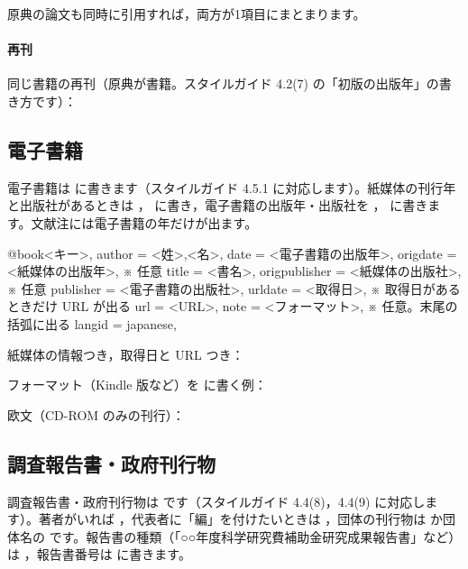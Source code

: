 
原典の論文も同時に引用すれば，両方が1項目にまとまります。


\paragraph{再刊}
同じ書籍の再刊（原典が書籍。スタイルガイド 4.2(7) の「初版の出版年」の書き方です）：


\subsection{電子書籍}\label{sec:ebook}
電子書籍は  に書きます（スタイルガイド 4.5.1 に対応します）。紙媒体の刊行年と出版社があるときは ， に書き，電子書籍の出版年・出版社を ， に書きます。文献注には電子書籍の年だけが出ます。

\begin{bibtemplate}
@book{<キー>,
  author        = {<姓>,<名>},
  date          = {<電子書籍の出版年>},
  origdate      = {<紙媒体の出版年>},    ※ 任意
  title         = {<書名>},
  origpublisher = {<紙媒体の出版社>},    ※ 任意
  publisher     = {<電子書籍の出版社>},
  urldate       = {<取得日>},            ※ 取得日があるときだけ URL が出る
  url           = {<URL>},
  note          = {<フォーマット>},      ※ 任意。末尾の括弧に出る
  langid        = {japanese},
}
\end{bibtemplate}

紙媒体の情報つき，取得日と URL つき：


フォーマット（Kindle 版など）を  に書く例：


欧文（CD-ROM のみの刊行）：


\subsection{調査報告書・政府刊行物}\label{sec:report}
調査報告書・政府刊行物は  です（スタイルガイド 4.4(8)，4.4(9) に対応します）。著者がいれば ，代表者に「編」を付けたいときは ，団体の刊行物は  か団体名の  です。報告書の種類（「○○年度科学研究費補助金研究成果報告書」など）は ，報告書番号は  に書きます。

